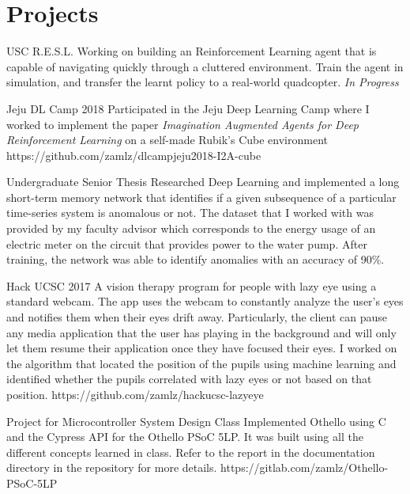\documentclass{cv}
\begin{document}
\section{Projects}
\begin{adjustwidth}{0.5cm}{0.5cm}

{USC R.E.S.L.}
{Working on building an Reinforcement Learning agent that is capable of
navigating quickly through a cluttered environment. Train the agent in
simulation, and transfer the learnt policy to a real-world quadcopter.
\textit{In Progress}}{}

{Jeju DL Camp 2018}
{Participated in the Jeju Deep Learning Camp where I worked to
implement the paper \textit{Imagination Augmented Agents for
Deep Reinforcement Learning} on a self-made Rubik's Cube environment}
{https://github.com/zamlz/dlcampjeju2018-I2A-cube}

{Undergraduate Senior Thesis}
{Researched Deep Learning and implemented a long short-term memory
network that identifies if a given subsequence of a particular
time-series system is anomalous or not. The dataset that I worked with
was provided by my faculty advisor which corresponds to the energy usage
of an electric meter on the circuit that provides power to the water
pump. After training, the network was able to identify anomalies with
an accuracy of 90\%.}{}

{Hack UCSC 2017}
{A vision therapy program for people with lazy eye using a standard
webcam. The app uses the webcam to constantly analyze the user's eyes
and notifies them when their eyes drift away. Particularly, the client
can pause any media application that the user has playing in the
background and will only let them resume their application once they
have focused their eyes. I worked on the algorithm that located the
position of the pupils using machine learning and identified whether
the pupils correlated with lazy eyes or not based on that position.}
{https://github.com/zamlz/hackucsc-lazyeye}

{Project for Microcontroller System Design Class}
{Implemented Othello using C and the Cypress API for the Othello PSoC 5LP.
It was built using all the different concepts learned in class. Refer to the
report in the documentation directory in the repository for more details.}
{https://gitlab.com/zamlz/Othello-PSoC-5LP}


\end{adjustwidth}
\end{document}
